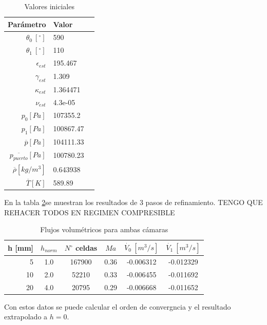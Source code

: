 \documentclass[11pt]{article}
\begin{document}
\begin{table}
    \centering
    \begin{tabular}{rll}\toprule
        Parámetro & Valor \\ \midrule
        $\theta_0\ [^{\circ}]$ & 590 \\
        $\theta_1\ [^{\circ}]$ & 110 \\
        $\epsilon_{est}$ & 195.467 \\
        $\gamma_{est}$ & 1.309 \\
        $\kappa_{est}$ & 1.364471 \\
        $\nu_{est}$ & 4.3e-05 \\
        $p_0 [Pa]$ & 107355.2 \\
        $p_1 [Pa]$ & 100867.47 \\
        $\overline{p} [Pa]$ & 104111.33 \\
        $\overline{p_{puerto}} [Pa]$ & 100780.23 \\
        $\overline{\rho} [kg/m^3]$ & 0.643938 \\
        $\overline{T} [K]$ & 589.89 \\ \bottomrule
    \end{tabular}
    \caption{Valores iniciales}
    \label{tab:caso0_ci}
\end{table}


En la tabla \ref{tab:res_caso0}se muestran los resultados de 3 pasos de
refinamiento. TENGO QUE REHACER TODOS EN REGIMEN COMPRESIBLE

\begin{table}
    \centering
    \begin{tabular}{rccccc}\toprule
        h [mm] & $h_{norm}$ & $N^{\circ}$ celdas & $Ma$ & $\dot{V_{0}}\ [m^3/s] $ & $\dot{V_{1}}\ [m^3/s]$ \\ \midrule
        5      & 1.0        & 167900             & 0.36 & -0.006312     & -0.012329 \\
        10     & 2.0        & 52210              & 0.33 & -0.006455     & -0.011692 \\
        20     & 4.0        & 20795              & 0.29 & -0.006668     & -0.011652 \\ \bottomrule
    \end{tabular}
    \caption{Flujos volumétricos para ambas cámaras}
    \label{tab:res_caso0}
\end{table}

Con estos datos se puede calcular el orden de convergncia y el resultado
extrapolado a $h=0$.
\end{document}
